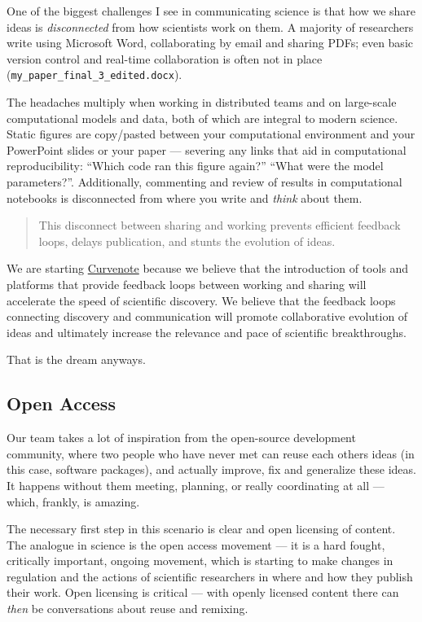 One of the biggest challenges I see in communicating science is that how we share ideas is \textit{disconnected} from how scientists work on them. A majority of researchers write using Microsoft Word, collaborating by email and sharing PDFs; even basic version control and real-time collaboration is often not in place (\texttt{my\_paper\_final\_3\_edited.docx}).

The headaches multiply when working in distributed teams and on large-scale computational models and data, both of which are integral to modern science. Static figures are copy/pasted between your computational environment and your PowerPoint slides or your paper — severing any links that aid in computational reproducibility: “Which code ran this figure again?” “What were the model parameters?”. Additionally, commenting and review of results in computational notebooks is disconnected from where you write and \textit{think} about them.

\begin{quote}
  This disconnect between sharing and working prevents efficient feedback loops, delays publication, and stunts the evolution of ideas.
\end{quote}

We are starting \href{http://curvenote.com/}{Curvenote} because we believe that the introduction of tools and platforms that provide feedback loops between working and sharing will accelerate the speed of scientific discovery. We believe that the feedback loops connecting discovery and communication will promote collaborative evolution of ideas and ultimately increase the relevance and pace of scientific breakthroughs.

That is the dream anyways. 🙂

\subsection*{Open Access}

Our team takes a lot of inspiration from the open-source development community, where two people who have never met can reuse each others ideas (in this case, software packages), and actually improve, fix and generalize these ideas. It happens without them meeting, planning, or really coordinating at all — which, frankly, is amazing.

The necessary first step in this scenario is clear and open licensing of content. The analogue in science is the open access movement — it is a hard fought, critically important, ongoing movement, which is starting to make changes in regulation and the actions of scientific researchers in where and how they publish their work. Open licensing is critical — with openly licensed content there can \textit{then} be conversations about reuse and remixing.

